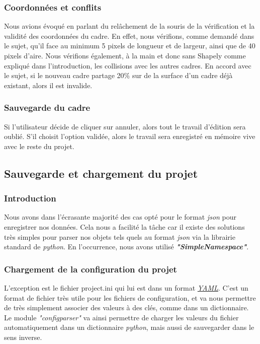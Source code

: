 \documentclass{rapport}
\begin{document}
            \subsubsection{Coordonnées et conflits}
            Nous avions évoqué en parlant du relâchement de la souris de la vérification et la validité des coordonnées du cadre. En effet, nous vérifions, comme demandé dans le sujet, qu'il face au minimum 5 pixels de longueur et de largeur, ainsi que de 40 pixels d'aire. Nous vérifions également, à la main et donc sans Shapely comme expliqué dans l'introduction, les collisions avec les autres cadres. En accord avec le sujet, si le nouveau cadre partage 20\% sur de la surface d'un cadre déjà existant, alors il est invalide.

            \subsubsection{Sauvegarde du cadre}
            Si l'utilisateur décide de cliquer sur annuler, alors tout le travail d'édition sera oublié. S'il choisit l'option validée, alors le travail sera enregistré en mémoire vive avec le reste du projet.
            
        \subsection{Sauvegarde et chargement du projet}

            \subsubsection{Introduction}
            Nous avons dans l'écrasante majorité des cas opté pour le format \textit{json} pour enregistrer nos données. Cela nous a facilité la tâche car il existe des solutions très simples pour parser nos objets tels quels au format \textit{json} via la librairie standard de \textit{python}. En l'occurrence, nous avons utilisé \textbf{\textit{"SimpleNamespace"}}.

            \subsubsection{Chargement de la configuration du projet}
            L'exception est le fichier project.ini qui lui est dans un format \href{https://en.wikipedia.org/wiki/YAML}{\textit{YAML}}. C'est un format de fichier très utile pour les fichiers de configuration, et va nous permettre de très simplement associer des valeurs à des clés, comme dans un dictionnaire. Le module \textit{"configparser"} va ainsi permettre de charger les valeurs du fichier automatiquement dans un dictionnaire \textit{python}, mais aussi de sauvegarder dans le sens inverse.
\end{document}
